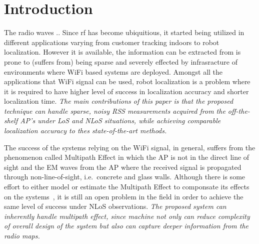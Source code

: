 \section{Introduction}
  The radio waves ..
  Since \gls{rf} has become ubiquitious, it started being utilized in different applications varying from customer tracking indoors to robot localization. %
  However it is available, the information can be extracted from is prone to (suffers from) being sparse and severely effected by infrasracture of environments where WiFi based systems are deployed.
  Amongst all the applications that WiFi signal can be used, robot localization is a problem where it is required to have higher level of success in localization accuracy and shorter localization time.
  \textit{The main contributions of this paper is that the proposed technique can handle sparse, noisy RSS measurements acquired from the off-the-shelf AP's under LoS and NLoS situations, while achieving comparable localization accuracy to thes state-of-the-art methods.}

  The success of the systems relying on the WiFi signal, in general, suffers from the phenomenon called Multipath Effect in which the AP is not in the direct line of sight and the EM waves from the AP where the received signal is propagated through non-line-of-sight, i.e.~concrete and glass walls.
  Although there is some effort to either model or estimate the Multipath Effect to componsate its effects on the systems~\cite{cai2015identification}, it is still an open problem in the field in order to achieve the same level of success under NLoS observations.
  \textit{The proposed system can inherently handle multipath effect, since machine not only can reduce complexity of overall design of the system but also can capture deeper information from the radio maps.}

